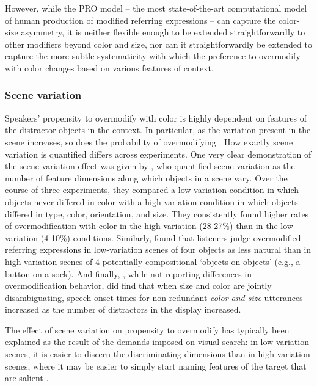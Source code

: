 \documentclass[11pt]{article}
\begin{document}
However, while the PRO model -- the most state-of-the-art computational model of human production of modified referring expressions -- can capture the color-size asymmetry, it is neither flexible enough to be extended straightforwardly to other modifiers beyond color and size, nor can it straightforwardly be extended to capture the more subtle systematicity with which the preference to overmodify with color changes based on various features of context. 

\subsubsection{Scene variation}
\label{sec:scenevariation}

Speakers' propensity to overmodify with color is highly dependent on features of the distractor objects in the context. In particular, as the variation present in the scene increases, so does the probability of overmodifying  \cite{Davies2013, Koolen2013}. How exactly scene variation is quantified differs across experiments. One very clear demonstration of the scene variation effect was given by , who quantified scene variation as the number of feature dimensions along which objects in a scene vary. Over the course of three experiments, they compared a low-variation condition in which objects never differed in color with a high-variation condition in which objects differed in type, color, orientation, and size. They consistently found higher rates of overmodification with color in the high-variation (28-27\%) than in the low-variation (4-10\%) conditions. Similarly,  found that listeners judge overmodified referring expressions in low-variation scenes of four objects as less natural than in high-variation scenes of 4 potentially compositional `objects-on-objects' (e.g., a button on a sock). And finally, , while not reporting differences in overmodification behavior, did find that when size and color are jointly disambiguating, speech onset times for non-redundant \emph{color-and-size} utterances increased as the number of distractors in the display increased.

The effect of scene variation on propensity to overmodify has typically been explained as the result of the demands imposed on visual search: in low-variation scenes, it is easier to discern the discriminating dimensions than in high-variation scenes, where it may be easier to simply start naming features of the target that are salient \cite{Koolen2013}. 
\end{document}
